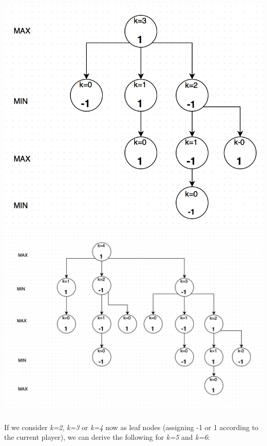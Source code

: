 \documentclass{article}
\begin{document}
\includegraphics[width=\textwidth]{k=3}
\includegraphics[width=\textwidth]{k=4}

\paragraph{} If we consider \textit{k=2}, \textit{k=3} or \textit{k=4} now as leaf nodes (assigning -1 or 1 according to the current player), we can derive the following for \textit{k=5} and \textit{k=6}:
\end{document}
